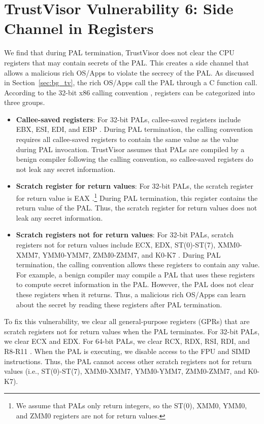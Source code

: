 \section{TrustVisor Vulnerability 6: Side Channel in Registers}
\label{sec:vuln_xmhf_tv_reg_side_channel}

We find that during PAL termination, TrustVisor does not clear the CPU registers that may contain secrets of the PAL. This creates a side channel that allows a malicious rich OS/Apps to violate the secrecy of the PAL. As discussed in Section~\ref{sec:bg_tv}, the rich OS/Apps call the PAL through a C function call. According to the 32-bit x86 calling convention \cite{fog_calling_convention}, registers can be categorized into three groups.

\begin{itemize}
\item \textbf{Callee-saved registers}: For 32-bit PALs, callee-saved registers include EBX, ESI, EDI, and EBP \cite{fog_calling_convention}. During PAL termination, the calling convention requires all callee-saved registers to contain the same value as the value during PAL invocation. TrustVisor assumes that PALs are compiled by a benign compiler following the calling convention, so callee-saved registers do not leak any secret information.

\item \textbf{Scratch register for return values}: For 32-bit PALs, the scratch register for return value is EAX \cite{fog_calling_convention}.\footnote{We assume that PALs only return integers, so the ST(0), XMM0, YMM0, and ZMM0 registers are not for return values.} During PAL termination, this register contains the return value of the PAL. Thus, the scratch register for return values does not leak any secret information.

\item \textbf{Scratch registers not for return values}: For 32-bit PALs, scratch registers not for return values include ECX, EDX, ST(0)-ST(7), XMM0-XMM7, YMM0-YMM7, ZMM0-ZMM7, and K0-K7 \cite{fog_calling_convention}. During PAL termination, the calling convention allows these registers to contain any value. For example, a benign compiler may compile a PAL that uses these registers to compute secret information in the PAL. However, the PAL does not clear these registers when it returns. Thus, a malicious rich OS/Apps can learn about the secret by reading these registers after PAL termination.
\end{itemize}

To fix this vulnerability, we clear all general-purpose registers (GPRs) that are scratch registers not for return values when the PAL terminates. For 32-bit PALs, we clear ECX and EDX. For 64-bit PALs, we clear RCX, RDX, RSI, RDI, and R8-R11 \cite{fog_calling_convention}. When the PAL is executing, we disable access to the FPU and SIMD instructions. Thus, the PAL cannot access other scratch registers not for return values (i.e., ST(0)-ST(7), XMM0-XMM7, YMM0-YMM7, ZMM0-ZMM7, and K0-K7).

